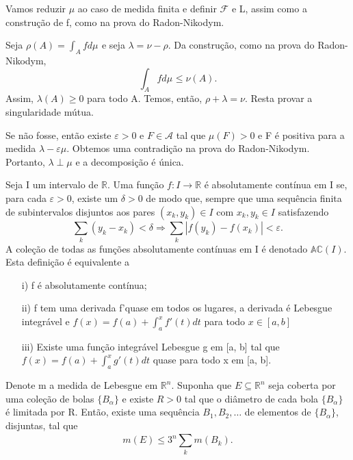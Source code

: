 \documentclass[MeasureTheory/measure_theory.tex]{subfiles}
\begin{document}
\begin{proof*}
	Vamos reduzir \(\mu \) ao caso de medida finita e definir \(\mathcal{F}\) e L, assim como a construção de f, como na prova do Radon-Nikodym.

	Seja \(\rho (A) = \int_{A}f d\mu_{}\) e seja \(\lambda = \nu - \rho\). Da construção, como na prova do Radon-Nikodym,
	\[
		\int_{A}f d\mu_{}\leq \nu (A).
	\]
	Assim, \(\lambda (A) \geq 0\) para todo A. Temos, então, \(\rho + \lambda = \nu \). Resta provar a singularidade mútua.

	Se não fosse, então existe \(\varepsilon > 0\) e \(F\in \mathcal{A}\) tal que \(\mu (F) > 0\) e F é positiva para a medida \(\lambda -\varepsilon \mu .\) Obtemos uma contradição na prova do Radon-Nikodym. Portanto, \(\lambda \perp \mu \) e a decomposição é única. \qedsymbol
\end{proof*}
Seja I um intervalo de \(\mathbb{R}.\) Uma função \(f:I\rightarrow \mathbb{R}\) é absolutamente contínua em I se, para cada \(\varepsilon  > 0\), existe um \(\delta > 0\) de modo que, sempre que uma sequência finita de subintervalos disjuntos aos pares \((x_{k}, y_{k})\in I\) com \(x_{k}, y_{k}\in I\) satisfazendo
\[
	\sum\limits_{k}^{}(y_{k}-x_{k}) < \delta \Rightarrow \sum\limits_{k}^{}|f(y_{k}) - f(x_{k})| < \varepsilon .
\]
A coleção de todas as funções absolutamente contínuas em I é denotado \(\mathbb{AC}(I).\) Esta definição é equivalente a
\begin{itemize}
	\item[i)] f é absolutamente contínua;
	\item[ii)] f tem uma derivada f'quase em todos os lugares, a derivada é Lebesgue integrável e \(f(x) = f(a) + \int_{a}^{x}f'(t)dt\) para todo \(x\in [a, b]\)
	\item[iii)] Existe uma função integrável Lebesgue g em [a, b] tal que \(f(x) = f(a) + \int_{a}^{x}g'(t)dt\) quase para todo x em [a, b].
\end{itemize}
\begin{lemma*}
	Denote m a medida de Lebesgue em \(\mathbb{R}^{n}.\) Suponha que \(E\subseteq \mathbb{R}^{n}\) seja coberta por uma coleção de bolas \(\{B_{\alpha }\} \) e existe \(R> 0\) tal que o diâmetro de cada bola \(\{B_{\alpha }\}\) é limitada por R.
	Então, existe uma sequência \(B_{1}, B_{2}, \dotsc \) de elementos de \(\{B_{\alpha }\}\), disjuntas, tal que
	\[
		m(E) \leq 3^{n}\sum\limits_{k}^{}m(B_{k}).
	\]
\end{lemma*}
\end{document}
